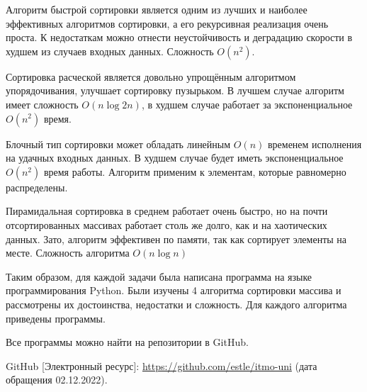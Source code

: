 \documentclass[14pt]{extreport}
\begin{document}
Алгоритм быстрой сортировки является одним из лучших и наиболее эффективных алгоритмов сортировки, а его рекурсивная реализация очень проста. К недостаткам можно отнести неустойчивость и деградацию скорости в худшем из случаев входных данных. Сложность $O(n^2)$.

Сортировка расческой является довольно упрощённым алгоритмом упорядочивания, улучшает сортировку пузырьком. В лучшем случае алгоритм имеет сложность $O(n\log 2n)$, в худшем случае работает за экспоненциальное $O(n^2)$ время.

Блочный тип сортировки может обладать линейным $O(n)$ временем исполнения на удачных входных данных. В худшем случае будет иметь экспоненциальное $O(n^2)$ время работы. Алгоритм применим к элементам, которые равномерно распределены.

Пирамидальная сортировка в среднем работает очень быстро, но на почти отсортированных массивах работает столь же долго, как и на хаотических данных. Зато, алгоритм эффективен по памяти, так как сортирует элементы на месте. Сложность алгоритма $O(n\log n)$

\conclusions

Таким образом, для каждой задачи была написана программа на языке программирования Python. Были изучены 4 алгоритма сортировки массива и рассмотрены их достоинства, недостатки и сложность. Для каждого алгоритма приведены программы.

Все программы можно найти на репозитории в GitHub\cite{bib1}.

\newpage
\begin{thebibliography}{99}

GitHub [Электронный ресурс]: \url{https://github.com/estle/itmo-uni} (дата обращения 02.12.2022).

\end{thebibliography}
\end{document}
